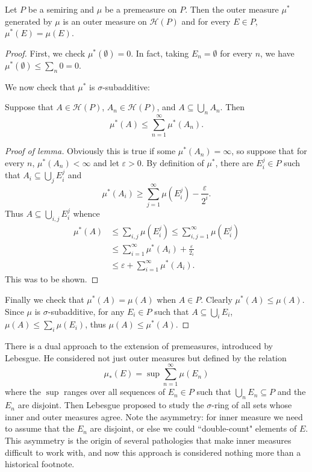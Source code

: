 \begin{theorem}
Let $P$ be a semiring and $\mu$ be a premeasure on $P$. Then the outer measure $\mu^*$ generated by $\mu$ is an outer measure on $\mathcal H(P)$ and for every $E \in P$, $\mu^*(E) = \mu(E)$.
\end{theorem}
\begin{proof}
First, we check $\mu^*(\emptyset) = 0$. In fact, taking $E_n = \emptyset$ for every $n$, we have $\mu^*(\emptyset) \leq \sum_n 0 = 0$.

We now check that $\mu^*$ is $\sigma$-subadditive:
\begin{lemma}
Suppose that $A \in \mathcal H(P)$, $A_n \in \mathcal H(P)$, and $A \subseteq \bigcup_n A_n$. Then
\[\mu^*(A) \leq \sum_{n=1}^\infty \mu^*(A_n).\]
\end{lemma}
\begin{proof}[Proof of lemma]
Obviously this is true if some $\mu^*(A_n) = \infty$, so suppose that for every $n$, $\mu^*(A_n) < \infty$ and let $\varepsilon > 0$.
By definition of $\mu^*$, there are $E_i^j \in P$ such that $A_i \subseteq \bigcup_j E_i^j$
and
\[\mu^*(A_i) \geq \sum_{j=1}^\infty \mu(E_i^j) - \frac{\varepsilon}{2^i}.\]
Thus $A \subseteq \bigcup_{i,j}E_i^j$ whence
\begin{align*}\mu^*(A) &\leq \sum_{i,j} \mu(E_i^j) \leq \sum_{i,j=1}^\infty \mu(E_i^j)\\ &\leq \sum_{i=1}^\infty \mu^*(A_i) + \frac{\varepsilon}{2_i}\\& \leq \varepsilon + \sum_{i=1}^\infty \mu^*(A_i).\end{align*}
This was to be shown.
\end{proof}

Finally we check that $\mu^*(A) = \mu(A)$ when $A \in P$. Clearly $\mu^*(A) \leq \mu(A)$.
Since $\mu$ is $\sigma$-subadditive, for any $E_i \in P$ such that $A \subseteq \bigcup_i E_i$, $\mu(A) \leq \sum_i \mu(E_i)$, thus $\mu(A) \leq \mu^*(A)$.
\end{proof}

\begin{subsec}
There is a dual approach to the extension of premeasures, introduced by Lebesgue.
He considered not just outer measures but  defined by the relation
\[\mu_*(E) = \sup \sum_{n=1}^\infty \mu(E_n)\]
where the $\sup$ ranges over all sequences of $E_n \in P$ such that $\bigcup_n E_n \subseteq P$ and the $E_n$ are disjoint.
Then Lebesgue proposed to study the $\sigma$-ring of all sets whose inner and outer measures agree.
Note the asymmetry: for inner measure we need to assume that the $E_n$ are disjoint, or else we could ``double-count" elements of $E$.
This asymmetry is the origin of several pathologies that make inner measures difficult to work with, and now this approach is considered nothing more than a historical footnote.
\end{subsec}

